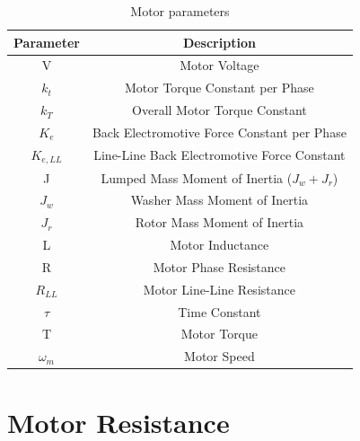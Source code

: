 \begin{table}[ht]
\begin{center}
\caption{Motor parameters}
\begin{tabular}[c]{|c|c|}

\hline
\textbf{Parameter} & \textbf{Description}\\

\hline
V & Motor Voltage\\

\hline
\(k_t\) & Motor Torque Constant per Phase\\

\hline
\(k_T\) & Overall Motor Torque Constant\\

\hline
\(K_e\) & Back Electromotive Force Constant per Phase\\

\hline
\(K_{e,LL}\) & Line-Line Back Electromotive Force Constant\\

\hline
J & Lumped Mass Moment of Inertia ($J_w + J_r$)\\

\hline
$J_w$ & Washer Mass Moment of Inertia\\

\hline
$J_r$ & Rotor Mass Moment of Inertia\\

\hline
L & Motor Inductance\\

\hline
R & Motor Phase Resistance\\

\hline
\(R_{LL}\) & Motor Line-Line Resistance\\

\hline
\(\tau\) & Time Constant\\

\hline
T & Motor Torque\\
\hline
\(\omega_m\) & Motor Speed\\

\hline
\end{tabular}

\label{table2}
\end{center}
\end{table}


\section{Motor Resistance}

